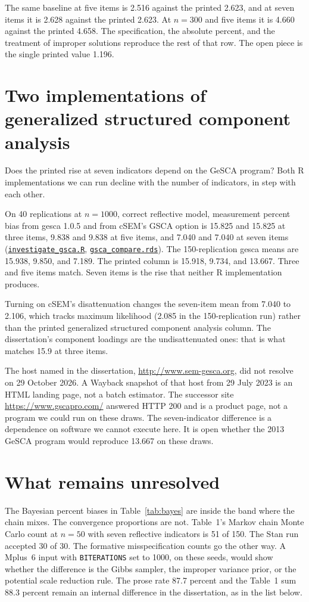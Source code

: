 \documentclass[11pt]{article}
\gdef\linkgsca{\href{https://github.com/alectionary/vibe-math/blob/master/formalization/chumney-sem-small-samples/simulation/investigate_gsca.R}{\texttt{investigate\_gsca.R}}}
\gdef\linkgscaout{\href{https://github.com/alectionary/vibe-math/blob/master/formalization/chumney-sem-small-samples/simulation/out/gsca_compare.rds}{\texttt{gsca\_compare.rds}}}
\begin{document}
The same baseline at five items is 2.516 against the printed 2.623, and at
seven items it is 2.628 against the printed 2.623. At $n=300$ and five
items it is 4.660 against the printed 4.658. The specification, the
absolute percent, and the treatment of improper solutions reproduce the
rest of that row. The open piece is the single printed value 1.196.

\section{Two implementations of generalized structured component analysis}
\label{sec:gsca7}

Does the printed rise at seven indicators depend on the GeSCA program?
Both R implementations we can run decline with the number of indicators,
in step with each other.

On 40 replications at $n=1000$, correct reflective model, measurement
percent bias from gesca 1.0.5 and from cSEM's GSCA option is 15.825 and
15.825 at three items, 9.838 and 9.838 at five items, and 7.040 and 7.040
at seven items
(\linkgsca,
\linkgscaout).
The 150-replication gesca means are 15.938, 9.850, and 7.189. The printed
column is 15.918, 9.734, and 13.667. Three and five items match. Seven
items is the rise that neither R implementation produces.

Turning on cSEM's disattenuation changes the seven-item mean from 7.040 to
2.106, which tracks maximum likelihood (2.085 in the 150-replication run)
rather than the printed generalized structured component analysis column.
The dissertation's component loadings are the undisattenuated ones: that
is what matches 15.9 at three items.

The host named in the dissertation, \url{http://www.sem-gesca.org}, did
not resolve on 29 October 2026. A Wayback snapshot of that host from
29 July 2023 is an HTML landing page, not a batch estimator. The successor
site \url{https://www.gscapro.com/} answered HTTP 200 and is a product
page, not a program we could run on these draws. The seven-indicator
difference is a dependence on software we cannot execute here. It is open
whether the 2013 GeSCA program would reproduce 13.667 on these draws.

\section{What remains unresolved}
\label{sec:open}

The Bayesian percent biases in Table~\ref{tab:bayes} are inside the band
where the chain mixes. The convergence proportions are not. Table~1's
Markov chain Monte Carlo count at $n=50$ with seven reflective indicators
is 51 of 150. The Stan run accepted 30 of 30. The formative
misspecification counts go the other way. A Mplus~6 input with
\texttt{BITERATIONS} set to 1000, on these seeds, would show whether the
difference is the Gibbs sampler, the improper variance prior, or the
potential scale reduction rule. The prose rate 87.7 percent and the
Table~1 sum 88.3 percent remain an internal difference in the
dissertation, as in the list below.
\end{document}
